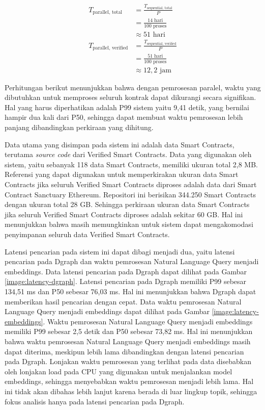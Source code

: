 \begin{align*}
    T_{\text{parallel, total}} &= \frac{T_{\text{sequential, total}}}{P} \\
    &= \frac{14 \text{ hari}}{100 \text{ proses}} \\
	&\approx 51 \text{ hari} \\
    T_{\text{parallel, verified}} &= \frac{T_{\text{sequential, verified}}}{P} \\
    &= \frac{51 \text{ hari}}{100 \text{ proses}} \\
	&\approx 12,2 \text{ jam}
\end{align*}

Perhitungan berikut menunjukkan bahwa dengan pemrosesan paralel, waktu yang dibutuhkan untuk memproses seluruh kontrak dapat dikurangi secara signifikan. Hal yang harus diperhatikan adalah P99 sistem yaitu 9,41 detik, yang bernilai hampir dua kali dari P50, sehingga dapat membuat waktu pemrosesan lebih panjang dibandingkan perkiraan yang dihitung.


Data utama yang disimpan pada sistem ini adalah data Smart Contracts, terutama \textit{source code} dari Verified Smart Contracts. Data yang digunakan oleh sistem, yaitu sebanyak 118 data Smart Contracts, memiliki ukuran total 2,8 MB. Referensi yang dapat digunakan untuk memperkirakan ukuran data Smart Contracts jika seluruh Verified Smart Contracts diproses adalah data dari Smart Contract Sanctuary Ethereum. Repositori ini berisikan 344.250 Smart Contracts dengan ukuran total 28 GB. Sehingga perkiraan ukuran data Smart Contracts jika seluruh Verified Smart Contracts diproses adalah sekitar 60 GB. Hal ini menunjukkan bahwa masih memungkinkan untuk sistem dapat mengakomodasi penyimpanan seluruh data Verified Smart Contracts.


Latensi pencarian pada sistem ini dapat dibagi menjadi dua, yaitu latensi pencarian pada Dgraph dan waktu pemrosesan Natural Language Query menjadi embeddings. Data latensi pencarian pada Dgraph dapat dilihat pada Gambar \ref{image:latency-dgraph}. Latensi pencarian pada Dgraph memiliki P99 sebesar 134,51 ms dan P50 sebesar 76,03 ms. Hal ini menunjukkan bahwa Dgraph dapat memberikan hasil pencarian dengan cepat. Data waktu pemrosesan Natural Language Query menjadi embeddings dapat dilihat pada Gambar \ref{image:latency-embeddings}. Waktu pemrosesan Natural Language Query menjadi embeddings memiliki P99 sebesar 2,5 detik dan P50 sebesar 73,82 ms. Hal ini menunjukkan bahwa waktu pemrosesan Natural Language Query menjadi embeddings masih dapat diterima, meskipun lebih lama dibandingkan dengan latensi pencarian pada Dgraph. Lonjakan waktu pemrosesan yang terlihat pada data disebabkan oleh lonjakan load pada CPU yang digunakan untuk menjalankan model embeddings, sehingga menyebabkan waktu pemrosesan menjadi lebih lama. Hal ini tidak akan dibahas lebih lanjut karena berada di luar lingkup topik, sehingga fokus analisis hanya pada latensi pencarian pada Dgraph.

